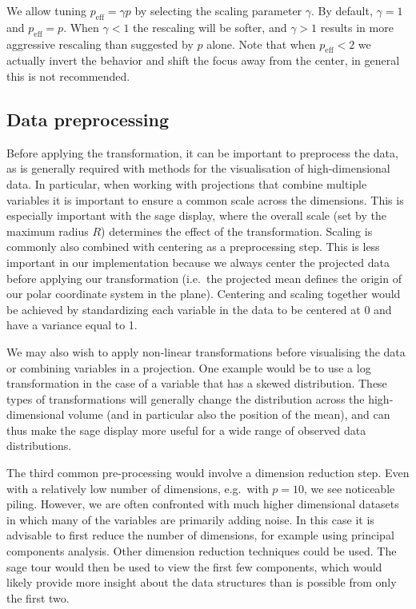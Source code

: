 \documentclass[]{interact}
\theoremstyle{plain}%
\theoremstyle{definition}
\theoremstyle{remark}
\begin{document}
We allow tuning \(p_{\mathrm{eff}} = \gamma p\) by selecting the scaling
parameter \(\gamma\). By default, \(\gamma=1\) and
\(p_{\mathrm{eff}}=p\). When \(\gamma<1\) the rescaling will be softer,
and \(\gamma>1\) results in more aggressive rescaling than suggested by
\(p\) alone. Note that when \(p_{\mathrm{eff}} < 2\) we actually invert
the behavior and shift the focus away from the center, in general this
is not recommended.

\hypertarget{sec:prep}{%
\subsection{Data preprocessing}\label{sec:prep}}

Before applying the transformation, it can be important to preprocess
the data, as is generally required with methods for the visualisation of
high-dimensional data. In particular, when working with projections that
combine multiple variables it is important to ensure a common scale
across the dimensions. This is especially important with the sage
display, where the overall scale (set by the maximum radius \(R\))
determines the effect of the transformation. Scaling is commonly also
combined with centering as a preprocessing step. This is less important
in our implementation because we always center the projected data before
applying our transformation (i.e.~the projected mean defines the origin
of our polar coordinate system in the plane). Centering and scaling
together would be achieved by standardizing each variable in the data to
be centered at 0 and have a variance equal to 1.

We may also wish to apply non-linear transformations before visualising
the data or combining variables in a projection. One example would be to
use a log transformation in the case of a variable that has a skewed
distribution. These types of transformations will generally change the
distribution across the high-dimensional volume (and in particular also
the position of the mean), and can thus make the sage display more
useful for a wide range of observed data distributions.

The third common pre-processing would involve a dimension reduction
step. Even with a relatively low number of dimensions, e.g.~with
\(p=10\), we see noticeable piling. However, we are often confronted
with much higher dimensional datasets in which many of the variables are
primarily adding noise. In this case it is advisable to first reduce the
number of dimensions, for example using principal components analysis.
Other dimension reduction techniques could be used. The sage tour would
then be used to view the first few components, which would likely
provide more insight about the data structures than is possible from
only the first two.
\end{document}
